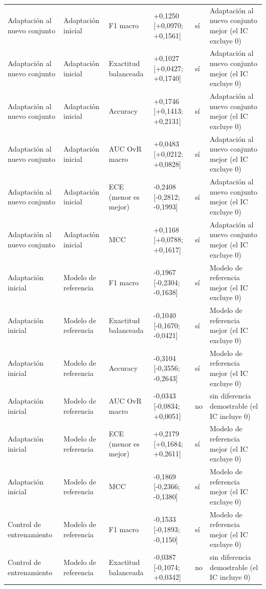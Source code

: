 \begin{longtable}{@{}llllll@{}}
Adaptación al nuevo conjunto & Adaptación inicial & F1 macro & +0,1250 [+0,0970; +0,1561] & sí & Adaptación al nuevo conjunto mejor (el IC excluye 0) \\
Adaptación al nuevo conjunto & Adaptación inicial & Exactitud balanceada & +0,1027 [+0,0427; +0,1740] & sí & Adaptación al nuevo conjunto mejor (el IC excluye 0) \\
Adaptación al nuevo conjunto & Adaptación inicial & Accuracy & +0,1746 [+0,1413; +0,2131] & sí & Adaptación al nuevo conjunto mejor (el IC excluye 0) \\
Adaptación al nuevo conjunto & Adaptación inicial & AUC OvR macro & +0,0483 [+0,0212; +0,0828] & sí & Adaptación al nuevo conjunto mejor (el IC excluye 0) \\
Adaptación al nuevo conjunto & Adaptación inicial & ECE (menor es mejor) & -0,2408 [-0,2812; -0,1993] & sí & Adaptación al nuevo conjunto mejor (el IC excluye 0) \\
Adaptación al nuevo conjunto & Adaptación inicial & MCC & +0,1168 [+0,0788; +0,1617] & sí & Adaptación al nuevo conjunto mejor (el IC excluye 0) \\
Adaptación inicial & Modelo de referencia & F1 macro & -0,1967 [-0,2304; -0,1638] & sí & Modelo de referencia mejor (el IC excluye 0) \\
Adaptación inicial & Modelo de referencia & Exactitud balanceada & -0,1040 [-0,1670; -0,0421] & sí & Modelo de referencia mejor (el IC excluye 0) \\
Adaptación inicial & Modelo de referencia & Accuracy & -0,3104 [-0,3556; -0,2643] & sí & Modelo de referencia mejor (el IC excluye 0) \\
Adaptación inicial & Modelo de referencia & AUC OvR macro & -0,0343 [-0,0834; +0,0051] & no & sin diferencia demostrable (el IC incluye 0) \\
Adaptación inicial & Modelo de referencia & ECE (menor es mejor) & +0,2179 [+0,1684; +0,2611] & sí & Modelo de referencia mejor (el IC excluye 0) \\
Adaptación inicial & Modelo de referencia & MCC & -0,1869 [-0,2366; -0,1380] & sí & Modelo de referencia mejor (el IC excluye 0) \\
Control de entrenamiento & Modelo de referencia & F1 macro & -0,1533 [-0,1893; -0,1150] & sí & Modelo de referencia mejor (el IC excluye 0) \\
Control de entrenamiento & Modelo de referencia & Exactitud balanceada & -0,0387 [-0,1074; +0,0342] & no & sin diferencia demostrable (el IC incluye 0) \\

\end{longtable}
